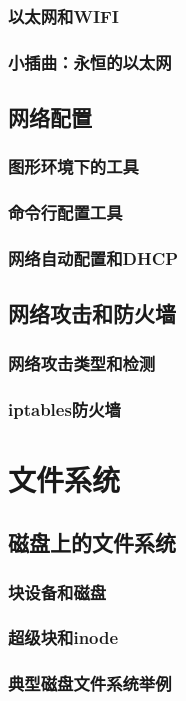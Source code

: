 \documentclass[amstex,twoside]{ctexbook}
\begin{document}
\subsection{ 以太网和WIFI}
\subsection*{  小插曲：永恒的以太网}
\section{  网络配置}
\subsection{  图形环境下的工具	}
\subsection{ 命令行配置工具}
\subsection{ 网络自动配置和DHCP}
\section{  网络攻击和防火墙	}
\subsection{ 网络攻击类型和检测}
\subsection{  iptables防火墙}

\chapter{文件系统}
\section{  磁盘上的文件系统	}
\subsection{  块设备和磁盘}
\subsection{ 超级块和inode}
\subsection{  典型磁盘文件系统举例}
\end{document}
